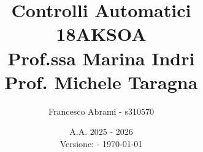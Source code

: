 \lstset{style=matstyle} %



\newtheorem*{theorem}{Teorema}
\newtheorem*{lemma}{Lemma}
\newtheorem*{corollary}{Corollario}
\newtheorem*{prop}{Proprietà}
\newtheorem*{definition}{Definizione}



\graphicspath{ {./images/} }


\usepackage[a4paper,
    textwidth=15.5cm,
    textheight=23.0cm,
    top=2.75cm,
    inner=2.5cm,
    outer=2.5cm
]{geometry}


\newcommand{\unit}[1]{\ensuremath{\, \mathrm{#1}}}
\renewcommand{\dateseparator}{-}


\title{\textbf{Controlli Automatici\\ 18AKSOA \\ Prof.ssa Marina Indri \\ Prof. Michele Taragna}}
\author{Francesco Abrami - s310570}
\date{A.A. 2025 - 2026 \\ \vspace{10pt} \small {Versione: \version \;- \today}}

























